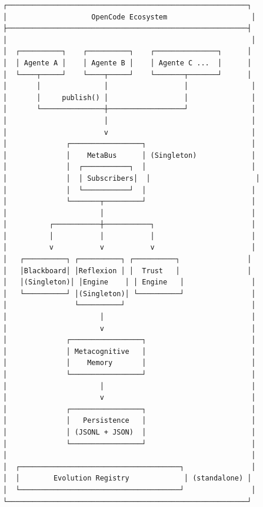 \begin{verbatim}
┌─────────────────────────────────────────────────────────┐
│                    OpenCode Ecosystem                    │
├─────────────────────────────────────────────────────────┤
│                                                          │
│  ┌──────────┐    ┌──────────┐    ┌───────────────┐      │
│  │ Agente A │    │ Agente B │    │ Agente C ...  │      │
│  └────┬─────┘    └────┬─────┘    └───────┬───────┘      │
│       │               │                  │               │
│       │     publish() │                  │               │
│       └───────────────┼──────────────────┘               │
│                       │                                  │
│                       v                                  │
│              ┌─────────────────┐                         │
│              │    MetaBus      │ (Singleton)             │
│              │  ┌───────────┐  │                         │
│              │  │ Subscribers│  │                         │
│              │  └───────────┘  │                         │
│              └───────┬─────────┘                         │
│                      │                                   │
│          ┌───────────┼───────────┐                       │
│          │           │           │                       │
│          v           v           v                       │
│   ┌──────────┐ ┌──────────┐ ┌──────────┐                │
│   │Blackboard│ │Reflexion │ │  Trust   │                │
│   │(Singleton)│ │Engine    │ │ Engine   │                │
│   └──────────┘ │(Singleton)│ └──────────┘                │
│                └──────────┘                              │
│                      │                                   │
│                      v                                   │
│              ┌─────────────────┐                         │
│              │ Metacognitive   │                         │
│              │    Memory       │                         │
│              └─────────────────┘                         │
│                      │                                   │
│                      v                                   │
│              ┌─────────────────┐                         │
│              │   Persistence   │                         │
│              │ (JSONL + JSON)  │                         │
│              └─────────────────┘                         │
│                                                          │
│  ┌──────────────────────────────────────┐                │
│  │        Evolution Registry             │ (standalone) │
│  └──────────────────────────────────────┘                │
└─────────────────────────────────────────────────────────┘
\end{verbatim}

